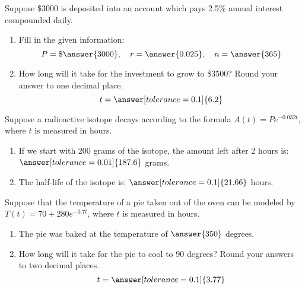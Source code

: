 \documentclass{ximera}
\begin{document}
 \begin{problem}\label{prob:160test3prob6}
 Suppose \$3000 is deposited into an account which pays 2.5\% annual interest compounded daily.  
 \begin{enumerate}
 \item Fill in the given information:
 $$P=\$\answer{3000},\quad r=\answer{0.025},\quad n=\answer{365}$$
 \item How long will it take for the investment to grow to \$3500?
 Round your answer to one decimal place.
 $$t=\answer[tolerance=0.1]{6.2}$$
 \end{enumerate}
 \end{problem}
 
 \begin{problem}\label{prob:160test3prob7}
 Suppose a radioactive isotope decays according to the formula $A(t)=Pe^{-0.032t}$, where $t$ is measured in hours.  
 \begin{enumerate}
     \item 
If we start with 200 grams of the isotope, the amount left after 2 hours is: $\answer[tolerance=0.01]{187.6}$ grams.
\item The half-life of the isotope is: $\answer[tolerance=0.1]{21.66}$ hours.
\end{enumerate}
 \end{problem}
 
 \begin{problem}\label{prob:160test3prob8}
 Suppose that the temperature of a pie taken out of the oven can be modeled by $T(t)=70+280e^{-0.7t}$, where $t$ is measured in hours.
 \begin{enumerate}
     \item The pie was baked at the temperature of $\answer{350}$ degrees.
     \item How long will it take for the pie to cool to 90 degrees?  Round your answers to two decimal places.
     $$t=\answer[tolerance=0.1]{3.77}$$
 \end{enumerate}
 \end{problem}
 
 
\end{document}
